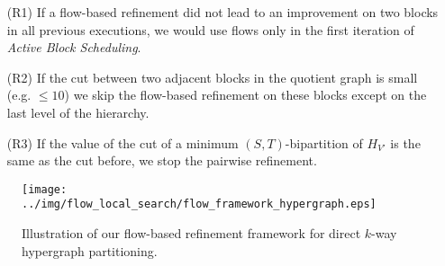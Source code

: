 \begin{enumerate}
\item[(R1)] If a flow-based refinement did not lead to an improvement on two blocks in all previous
            executions, we would use flows only in the first iteration of 
            \emph{Active Block Scheduling}.
\item[(R2)] If the cut between two adjacent blocks in the quotient graph is small (e.g. $\le 10$) we
            skip the flow-based refinement on these blocks except on the last level of the hierarchy.
\item[(R3)] If the value of the cut of a minimum $(S,T)$-bipartition of $H_{V'}$ is the same 
            as the cut before, we stop the pairwise refinement.
\end{enumerate}

\begin{figure}
\centering 
\texttt{[image: ../img/flow\_local\_search/flow\_framework\_hypergraph.eps]}
\caption{Illustration of our flow-based refinement framework for direct $k$-way hypergraph
         partitioning.}
\label{img:flow_framework}
\end{figure} 